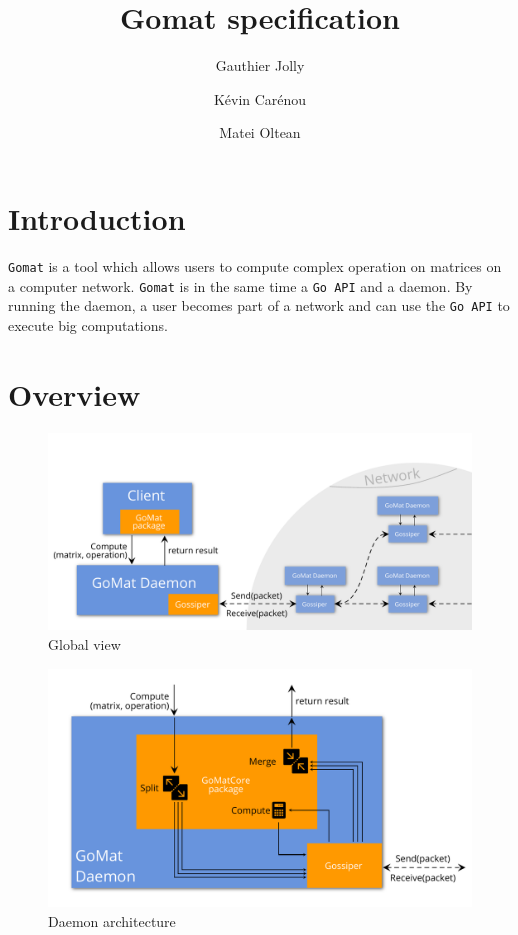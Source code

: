 \documentclass[a4paper,12pt]{article}
\title{Gomat specification}
\author{Gauthier Jolly \and K\'{e}vin Car\'{e}nou \and Matei Oltean}
\newcommand{\Gomat}{\texttt{Gomat}\xspace}
\begin{document}
\maketitle
\tableofcontents
\newpage
    \section{Introduction}
    \Gomat is a tool which allows users to compute complex operation on matrices on a computer network.
    \Gomat is in the same time a \texttt{Go API} and a daemon. By running the daemon, a user becomes part of a network and can use the \texttt{Go API} to execute big computations.

    \section{Overview}
    \begin{figure}[!ht]
        \includegraphics[width=.95\textwidth]{global_view.pdf}
        \caption{Global view}
        \label{glbView}
    \end{figure}
    \begin{figure}[!ht]
        \includegraphics[width=.95\textwidth]{daemon_view.pdf}
        \caption{Daemon architecture}
        \label{daemonView}
    \end{figure}
    
\end{document}
